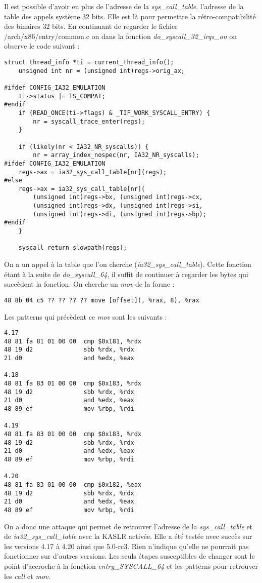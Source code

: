 \documentclass[journal, a4paper]{IEEEtran}
\begin{document}
Il est possible d'avoir en plus de l'adresse de la \textit{sys\_call\_table}, l'adresse de la table des appels système 32 bits. Elle est là pour permettre la rétro-compatibilité des binaires 32 bits. En continuant de regarder le fichier /arch/x86/entry/common.c on dans la fonction \textit{do\_syscall\_32\_irqs\_on} on observe le code suivant :
\begin{lstlisting}[style=CStyle]
struct thread_info *ti = current_thread_info();
	unsigned int nr = (unsigned int)regs->orig_ax;

#ifdef CONFIG_IA32_EMULATION
	ti->status |= TS_COMPAT;
#endif
	if (READ_ONCE(ti->flags) & _TIF_WORK_SYSCALL_ENTRY) {
		nr = syscall_trace_enter(regs);
	}

	if (likely(nr < IA32_NR_syscalls)) {
		nr = array_index_nospec(nr, IA32_NR_syscalls);
#ifdef CONFIG_IA32_EMULATION
	regs->ax = ia32_sys_call_table[nr](regs);
#else
	regs->ax = ia32_sys_call_table[nr](
		(unsigned int)regs->bx, (unsigned int)regs->cx,
		(unsigned int)regs->dx, (unsigned int)regs->si,
		(unsigned int)regs->di, (unsigned int)regs->bp);
#endif
	}

	syscall_return_slowpath(regs);
\end{lstlisting}
On a un appel à la table que l'on cherche (\textit{ia32\_sys\_call\_table}).
Cette fonction étant à la suite de \textit{do\_syscall\_64}, il suffit de continuer à regarder les bytes qui succèdent la fonction. On cherche un \textit{mov} de la forme :
\begin{lstlisting}[style=CStyle]
48 8b 04 c5 ?? ?? ?? ?? move [offset](, %rax, 8), %rax
\end{lstlisting}
Les patterns qui précèdent ce \textit{mov} sont les suivants :
\begin{lstlisting}[style=CStyle]
4.17  
48 81 fa 81 01 00 00  cmp $0x181, %rdx  
48 19 d2              sbb %rdx, %rdx  
21 d0                 and %edx, %eax  

4.18  
48 81 fa 83 01 00 00  cmp $0x183, %rdx  
48 19 d2              sbb %rdx, %rdx  
21 d0                 and %edx, %eax  
48 89 ef              mov %rbp, %rdi  

4.19  
48 81 fa 83 01 00 00  cmp $0x183, %rdx  
48 19 d2              sbb %rdx, %rdx  
21 d0                 and %edx, %eax  
48 89 ef              mov %rbp, %rdi  

4.20  
48 81 fa 83 01 00 00  cmp $0x182, %eax  
48 19 d2              sbb %rdx, %rdx  
21 d0                 and %edx, %eax  
48 89 ef              mov %rbp, %rdi  
\end{lstlisting}
On a donc une attaque qui permet de retrouver l'adresse de la \textit{sys\_call\_table} et de \textit{ia32\_sys\_call\_table} avec la KASLR activée. Elle a été testée avec succès sur les versions 4.17 à 4.20 ainsi que 5.0-rc3. Rien n'indique qu'elle ne pourrait pas fonctionner sur d'autres versions. Les seuls étapes susceptibles de changer sont le point d'accroche à la fonction \textit{entry\_SYSCALL\_64} et les patterns pour retrouver les \textit{call} et \textit{mov}.
\end{document}
